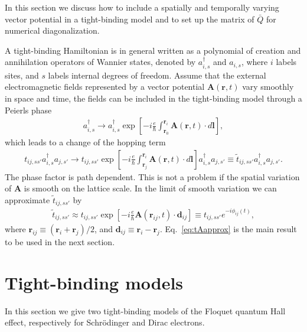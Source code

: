 \documentclass[11pt,letterpaper]{article}
\begin{document}
In this section we discuss how to include a spatially and temporally varying vector potential in a tight-binding model and to set up the matrix of $\bar{Q}$ for numerical diagonalization.

A tight-binding Hamiltonian is in general written as a polynomial of creation and annihilation operators of Wannier states, denoted by $a_{i,s}^\dag$ and $a_{i,s}$, where $i$ labels sites, and $s$ labels internal degrees of freedom. Assume that the external electromagnetic fields represented by a vector potential $\bm A(\bm r, t)$ vary smoothly in space and time, the fields can be included in the tight-binding model through a Peierls phase
\begin{eqnarray}
a_{i,s}^\dag \rightarrow a_{i,s}^\dag \exp\left[- i\frac{e}{\hbar} \int_{\bm r_0}^{\bm r_i}  \bm A(\bm r, t) \cdot d\bm l \right],
\end{eqnarray}
which leads to a change of the hopping term
\begin{eqnarray}\label{eq:tintA}
t_{ij,ss'} a_{i,s}^\dag a_{j,s'} \rightarrow t_{ij,ss'}  \exp\left[- i\frac{e}{\hbar} \int_{\bm r_j}^{\bm r_i}  \bm A(\bm r, t) \cdot d\bm l \right] a_{i,s}^\dag a_{j,s'} \equiv \tilde{t}_{ij,ss'}  a_{i,s}^\dag a_{j,s'}.
\end{eqnarray}
The phase factor is path dependent. This is not a problem if the spatial variation of $\bm A$ is smooth on the lattice scale. In the limit of smooth variation we can approximate $\tilde{t}_{ij,ss'} $ by 
\begin{eqnarray}\label{eq:tAapprox}
\tilde{t}_{ij,ss'} \approx t_{ij,ss'}  \exp\left[- i\frac{e}{\hbar} \bm A(\bm r_{ij}, t) \cdot \bm d_{ij} \right] \equiv t_{ij,ss'} e^{-i \phi_{ij}(t)},
\end{eqnarray}
where $\bm r_{ij} \equiv (\bm r_i + \bm r_j)/2$, and $\bm d_{ij} \equiv \bm r_i - \bm r_j$. Eq.~\ref{eq:tAapprox} is the main result to be used in the next section.

\section{Tight-binding models}
In this section we give two tight-binding models of the Floquet quantum Hall effect, respectively for Schr\"{o}dinger and Dirac electrons.
\end{document}
